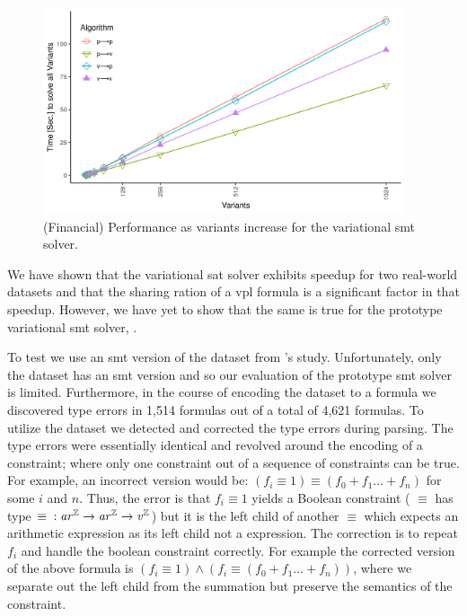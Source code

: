 \label{section:case-studies:vsmt}
%
\begin{figure}[h]
  \includegraphics[width=0.95\textwidth]{Plots/RQ1_Fin_Smt}
  \caption{(Financial) Performance as variants increase for the variational
    \ac{smt} solver.}%
  \label{res:rq1:vsmt}
\end{figure}
%
We have shown that the variational \ac{sat} solver exhibits speedup for two
real-world datasets and that the sharing ration of a \ac{vpl} formula is a
significant factor in that speedup. However, we have yet to show that the same
is true for the prototype variational \ac{smt} solver, \vsmt{}.

To test \vsmt{} we use an \ac{smt} version of the \fin{} dataset from \nieke{}'s
study. Unfortunately, only the \fin{} dataset has an \ac{smt} version and so our
evaluation of the prototype \ac{smt} solver is limited. Furthermore, in the
course of encoding the dataset to a \evpl{} formula we discovered type errors
in 1,514 formulas out of a total of 4,621 formulas. To utilize the dataset we
detected and corrected the type errors during parsing. The type errors were
essentially identical and revolved around the encoding of a 
constraint; where only one constraint out of a sequence of constraints can be
true. For example, an incorrect version would be: $(f_{i} \equiv{} 1) \equiv{}
(f_{0} + f_{1} \ldots{} + f_{n})$ for some $i$ and $n$. Thus, the error is that
$f_{i} \equiv 1$ yields a Boolean constraint (\ie{} $\equiv$ has type $\equiv{}
: \mathit{ar^{\mathbb{Z}}}{} \rightarrow \mathit{ar^{\mathbb{Z}}}{} \rightarrow{} \mathit{v^{\mathbb{Z}}}{}$) but it is the left child of
another $\equiv$ which expects an arithmetic expression as its left child not a
\eIL{} expression. The correction is to repeat $f_{i}$ and handle the boolean
constraint correctly. For example the corrected version of the above formula is
$(f_{i} \equiv{} 1) \wedge{} (f_{i} \equiv{} (f_{0} + f_{1} \ldots{} + f_{n}))$,
where we separate out the left child from the summation but preserve the
semantics of the  constraint.

